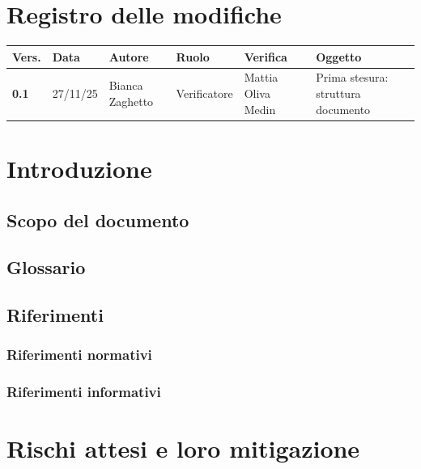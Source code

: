 \documentclass[a4paper,12pt]{article}
\begin{document}


\newpage
\section*{Registro delle modifiche}

\begin{table}[h!]
\begin{tabularx}{\textwidth}{|l|l|l|l|L|L|}
\hline
\textbf{Vers.} & \textbf{Data} & \textbf{Autore} & \textbf{Ruolo} & \textbf{Verifica} & \textbf{Oggetto} \\
\hline
\textbf{0.1} & 27/11/25 & Bianca Zaghetto & Verificatore & Mattia Oliva Medin & Prima stesura: struttura documento \\
\hline
\end{tabularx}
\end{table}

\newpage
\tableofcontents

\newpage
\listoffigures

\newpage
\listoftables

\newpage

\section{Introduzione}
    \subsection{Scopo del documento}
    \subsection{Glossario}
    \subsection{Riferimenti}
        \subsubsection{Riferimenti normativi}
        \subsubsection{Riferimenti informativi}

\newpage
\section{Rischi attesi e loro mitigazione}
\label{sec:rischi}
\end{document}
